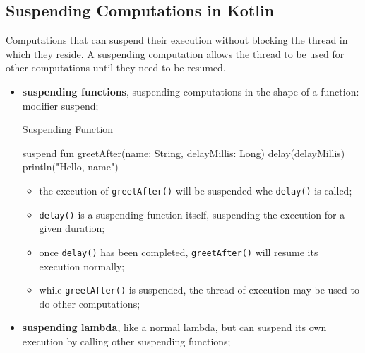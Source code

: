 \subsection{Suspending Computations in Kotlin}\label{sub:rs_suspending_computations_in_kotlin} %
Computations that can suspend their execution without blocking the thread in which they reside.
A suspending computation allows the thread to be used for other computations until they need to be resumed.
\begin{note}[Types]
    \begin{itemize}
        \item \textbf{suspending functions}, suspending computations in the shape of a function: modifier suspend;
            \begin{example}{Suspending Function}{}
                \begin{codeblock}[Kotlin]{}
    suspend fun greetAfter(name: String, delayMillis: Long) {
        delay(delayMillis)
        println("Hello, {name}")
    }
                \end{codeblock}
                \begin{itemize}
                    \item the execution of \texttt{greetAfter()} will be suspended whe \texttt{delay()} is called;
                    \item \texttt{delay()} is a suspending function itself, suspending the execution for a given duration;
                    \item once \texttt{delay()} has been completed, \texttt{greetAfter()} will resume its execution normally;
                    \item while \texttt{greetAfter()} is suspended, the thread of execution may be used to do other computations;
                \end{itemize}
            \end{example}
        \item \textbf{suspending lambda}, like a normal lambda, but can suspend its own execution by calling other suspending functions;
    \end{itemize}

\end{note}
%
